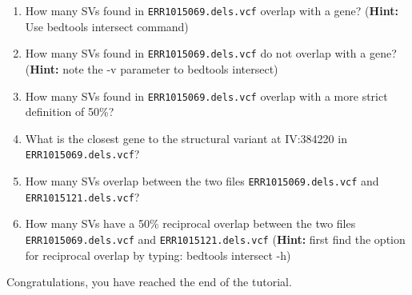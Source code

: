 \documentclass[11pt]{article}
\begin{document}
\begin{enumerate}
\def\labelenumi{\arabic{enumi}.}
\item
  How many SVs found in \texttt{ERR1015069.dels.vcf} overlap with a
  gene? (\textbf{Hint:} Use bedtools intersect command)
\item
  How many SVs found in \texttt{ERR1015069.dels.vcf} do not overlap with
  a gene? (\textbf{Hint:} note the -v parameter to bedtools intersect)
\item
  How many SVs found in \texttt{ERR1015069.dels.vcf} overlap with a more
  strict definition of 50\%?
\item
  What is the closest gene to the structural variant at IV:384220 in
  \texttt{ERR1015069.dels.vcf}?
\item
  How many SVs overlap between the two files
  \texttt{ERR1015069.dels.vcf} and \texttt{ERR1015121.dels.vcf}?
\item
  How many SVs have a 50\% reciprocal overlap between the two files
  \texttt{ERR1015069.dels.vcf} and \texttt{ERR1015121.dels.vcf}
  (\textbf{Hint:} first find the option for reciprocal overlap by
  typing: bedtools intersect -h)
\end{enumerate}

    Congratulations, you have reached the end of the tutorial.


\end{document}
